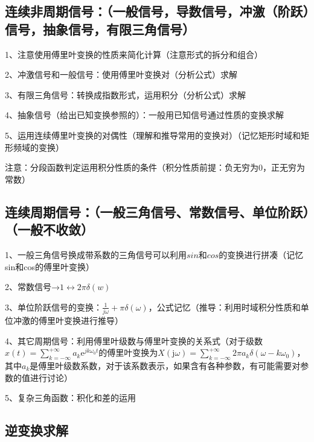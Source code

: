 \subsection{连续非周期信号：（一般信号，导数信号，冲激（阶跃）信号，抽象信号，有限三角信号）}

1、注意使用傅里叶变换的性质来简化计算（注意形式的拆分和组合）

2、冲激信号和一般信号：使用傅里叶变换对（分析公式）求解

3、有限三角信号：转换成指数形式，运用积分（分析公式）求解

4、抽象信号（给出已知变换参照的）：一般用已知信号通过性质的变换求解

5、运用连续傅里叶变换的对偶性（理解和推导常用的变换对）（记忆矩形时域和矩形频域的变换）

注意：分段函数判定运用积分性质的条件（积分性质前提：负无穷为0，正无穷为常数）



\subsection{连续周期信号：（一般三角信号、常数信号、单位阶跃）（一般不收敛）}

1、一般三角信号换成带系数的三角信号可以利用$sin$和$cos$的变换进行拼凑（记忆sin和cos的傅里叶变换）

2、常数信号→$1 \leftrightarrow 2\pi \delta(w)$

3、单位阶跃信号的变换：$\frac{1}{j \omega}+\pi \delta(\omega)$，公式记忆（推导：利用时域积分性质和单位冲激的傅里叶变换进行推导）

4、其它周期信号：利用傅里叶级数与傅里叶变换的关系式（对于级数$x(t)=\sum_{k=-\infty}^{+\infty} a_{k} \mathrm{e}^{j k \omega_{0} t}$的傅里叶变换为$X(\mathrm{j} \omega)=\sum_{k=-\infty}^{+\infty} 2 \pi a_{k} \delta\left(\omega-k \omega_{0}\right)$，其中$a_k$是傅里叶级数系数，对于该系数表示，如果含有各种参数，有可能需要对参数的值进行讨论）

5、复杂三角函数：积化和差的运用



\subsection{逆变换求解}

